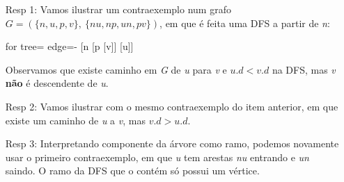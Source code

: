 \documentclass{homework}
\begin{document}
\pagestyle{fancy}

	\begin{enumerate}
		\item[Resp 1:] Vamos ilustrar um contraexemplo num grafo $G = (\{n,u,p,v\},\ \{nu,np,un,pv\})$, em que é feita uma DFS a partir de \textit{n}:
		\begin{center}\begin{forest}
		for tree={
            edge={-}		
		}[n [p [v]] [u]]
        \end{forest}\end{center}
        Observamos que existe caminho em \textit{G} de \textit{u} para \textit{v} e $u.d < v.d$ na DFS, mas \textit{v} \textbf{não} é descendente de \textit{u}.
        \item[Resp 2:] Vamos ilustrar com o mesmo contraexemplo do item anterior, em que existe um caminho de \textit{u} a \textit{v}, mas $v.d > u.d$.
        \item[Resp 3:] Interpretando componente da árvore como ramo, podemos novamente usar o primeiro contraexemplo, em que \textit{u} tem arestas \textit{nu} entrando e \textit{un} saindo. O ramo da DFS que o contém só possui um vértice.
	\end{enumerate}
\end{document}

